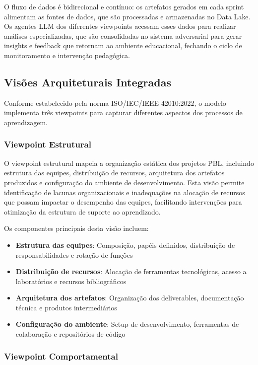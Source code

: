 \documentclass[english, spanish, brazilian]{modelo_dt}
\begin{document}
O fluxo de dados é bidirecional e contínuo: os artefatos gerados em cada sprint alimentam as fontes de dados, que são processadas e armazenadas no Data Lake. Os agentes LLM dos diferentes viewpoints acessam esses dados para realizar análises especializadas, que são consolidadas no sistema adversarial para gerar insights e feedback que retornam ao ambiente educacional, fechando o ciclo de monitoramento e intervenção pedagógica\@.

\subsection{Visões Arquiteturais Integradas}

Conforme estabelecido pela norma ISO/IEC/IEEE 42010:2022, o modelo implementa três viewpoints para capturar diferentes aspectos dos processos de aprendizagem\@.

\subsubsection{Viewpoint Estrutural}

O viewpoint estrutural mapeia a organização estática dos projetos PBL, incluindo estrutura das equipes, distribuição de recursos, arquitetura dos artefatos produzidos e configuração do ambiente de desenvolvimento\@. Esta visão permite identificação de lacunas organizacionais e inadequações na alocação de recursos que possam impactar o desempenho das equipes, facilitando intervenções para otimização da estrutura de suporte ao aprendizado\@.

Os componentes principais desta visão incluem:
\begin{itemize}
\item \textbf{Estrutura das equipes}: Composição, papéis definidos, distribuição de responsabilidades e rotação de funções
\item \textbf{Distribuição de recursos}: Alocação de ferramentas tecnológicas, acesso a laboratórios e recursos bibliográficos
\item \textbf{Arquitetura dos artefatos}: Organização dos deliverables, documentação técnica e produtos intermediários
\item \textbf{Configuração do ambiente}: Setup de desenvolvimento, ferramentas de colaboração e repositórios de código
\end{itemize}

\subsubsection{Viewpoint Comportamental}
\end{document}
